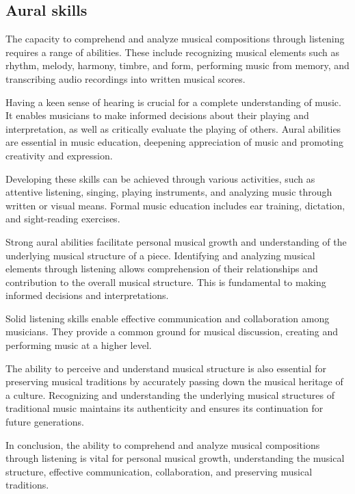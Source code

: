 \subsection{Aural skills}

The capacity to comprehend and analyze musical compositions through listening requires a range of abilities. These include recognizing musical elements such as rhythm, melody, harmony, timbre, and form, performing music from memory, and transcribing audio recordings into written musical scores.

Having a keen sense of hearing is crucial for a complete understanding of music. It enables musicians to make informed decisions about their playing and interpretation, as well as critically evaluate the playing of others. Aural abilities are essential in music education, deepening appreciation of music and promoting creativity and expression.

Developing these skills can be achieved through various activities, such as attentive listening, singing, playing instruments, and analyzing music through written or visual means. Formal music education includes ear training, dictation, and sight-reading exercises.

Strong aural abilities facilitate personal musical growth and understanding of the underlying musical structure of a piece. Identifying and analyzing musical elements through listening allows comprehension of their relationships and contribution to the overall musical structure. This is fundamental to making informed decisions and interpretations.

Solid listening skills enable effective communication and collaboration among musicians. They provide a common ground for musical discussion, creating and performing music at a higher level.

The ability to perceive and understand musical structure is also essential for preserving musical traditions by accurately passing down the musical heritage of a culture. Recognizing and understanding the underlying musical structures of traditional music maintains its authenticity and ensures its continuation for future generations.

In conclusion, the ability to comprehend and analyze musical compositions through listening is vital for personal musical growth, understanding the musical structure, effective communication, collaboration, and preserving musical traditions.